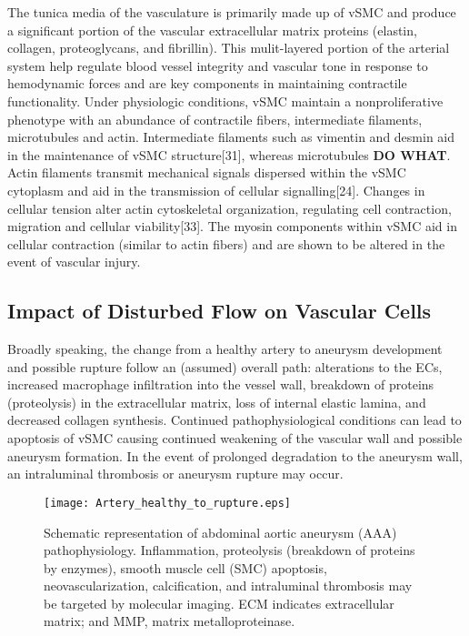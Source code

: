 The tunica media of the vasculature is primarily made up of vSMC and produce a significant portion of the vascular extracellular matrix proteins (elastin, collagen, proteoglycans, and fibrillin). This mulit-layered portion of the arterial system help regulate blood vessel integrity and vascular tone in response to hemodynamic forces and are key components in maintaining contractile functionality. Under physiologic conditions, vSMC maintain a nonproliferative phenotype with an abundance of contractile fibers, intermediate filaments, microtubules and actin. Intermediate filaments such as vimentin and desmin aid in the maintenance of vSMC structure[31], whereas microtubules \textbf{DO WHAT}. Actin filaments  transmit mechanical signals dispersed within the vSMC cytoplasm and aid in the transmission of cellular signalling[24]. Changes in cellular tension alter actin cytoskeletal organization, regulating cell contraction, migration and cellular viability[33]. The myosin components within vSMC aid in cellular contraction (similar to actin fibers) and are shown to be altered in the event of vascular injury.

\subsection{Impact of Disturbed Flow on Vascular Cells}
Broadly speaking, the change from a healthy artery to aneurysm development and possible rupture follow an (assumed) overall path: alterations to the ECs, increased macrophage infiltration into the vessel wall, breakdown of proteins (proteolysis) in the extracellular matrix\cite{ramella2018relevance,sawyer2016lymphocytes}, loss of internal elastic lamina\cite{wang2018rabbit,savastano2018biology}, and decreased collagen synthesis\cite{liu2018cyclic,klaus2017association}. Continued pathophysiological conditions can lead to apoptosis of vSMC causing continued weakening of the vascular wall and possible aneurysm formation. In the event of prolonged degradation to the aneurysm wall, an intraluminal thrombosis\cite{di2017hemodynamics,kelsey2017comparison,leach2019relative} or aneurysm rupture may occur.

\begin{figure}[!h]
  \begin{center}
    \texttt{[image: Artery\_healthy\_to\_rupture.eps]}
  \end{center}
  \caption{Schematic representation of abdominal aortic aneurysm (AAA) pathophysiology. Inflammation, proteolysis (breakdown of proteins by enzymes), smooth muscle cell (SMC) apoptosis, neovascularization, calcification, and intraluminal thrombosis may be targeted by molecular imaging. ECM indicates extracellular matrix; and MMP, matrix metalloproteinase.} 
   \label{Artery_to_rupture}
\end{figure}




